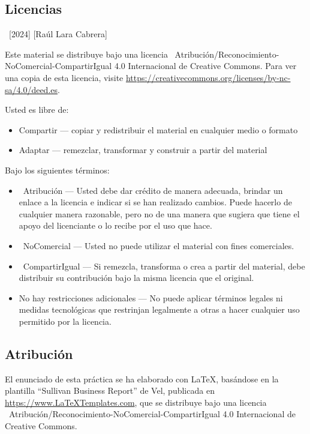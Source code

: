 \documentclass[
    a4paper, %
    12pt, %
]{CSSullivanBusinessReport}
\begin{document}
\begin{twothirdswidth} %
    \footnotesize %
    
    \subsection*{Licencias}
    
    \textcopyright~[2024] [Raúl Lara Cabrera] 
    
    Este material se distribuye bajo una licencia \ccbyncsaeu~Atribución/Reconocimiento-NoComercial-CompartirIgual 4.0 Internacional de Creative Commons. Para ver una copia de esta licencia, visite \url{https://creativecommons.org/licenses/by-nc-sa/4.0/deed.es}. 
    
    Usted es libre de:
    \begin{itemize}
        \item Compartir — copiar y redistribuir el material en cualquier medio o formato
        \item Adaptar — remezclar, transformar y construir a partir del material
    \end{itemize}
    Bajo los siguientes términos:
    \begin{itemize}
        \item \ccAttribution~Atribución — Usted debe dar crédito de manera adecuada, brindar un enlace a la licencia e indicar si se han realizado cambios. Puede hacerlo de cualquier manera razonable, pero no de una manera que sugiera que tiene el apoyo del licenciante o lo recibe por el uso que hace.
        \item \ccNonCommercialEU~NoComercial — Usted no puede utilizar el material con fines comerciales.
        \item \ccShareAlike~CompartirIgual — Si remezcla, transforma o crea a partir del material, debe distribuir su contribución bajo la misma licencia que el original.
        \item No hay restricciones adicionales — No puede aplicar términos legales ni medidas tecnológicas que restrinjan legalmente a otras a hacer cualquier uso permitido por la licencia.
    \end{itemize}

    \subsection*{Atribución}

    El enunciado de esta práctica se ha elaborado con \LaTeX, basándose en la plantilla ``Sullivan Business Report'' de Vel, publicada en \url{https://www.LaTeXTemplates.com}, que se distribuye bajo una licencia \ccbyncsaeu~Atribución/Reconocimiento-NoComercial-CompartirIgual 4.0 Internacional de Creative Commons.
    

\end{twothirdswidth}
\end{document}
